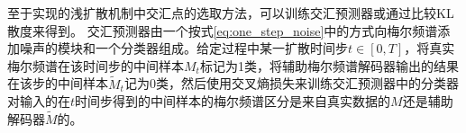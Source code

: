 %
至于实现的浅扩散机制中交汇点的选取方法，可以训练交汇预测器或通过比较KL散度来得到。
交汇预测器由一个按式\eqref{eq:one_step_noise}中的方式向梅尔频谱添加噪声的模块和一个分类器组成。给定过程中某一扩散时间步$t\in[0, T]$，将真实梅尔频谱在该时间步的中间样本$M_t$标记为1类，将辅助梅尔频谱解码器输出的结果在该步的中间样本$\widetilde{M}_t$记为0类，然后使用交叉熵损失来训练交汇预测器中的分类器对输入的在$t$时间步得到的中间样本的梅尔频谱区分是来自真实数据的$M$还是辅助解码器$\widetilde{M}$的。
